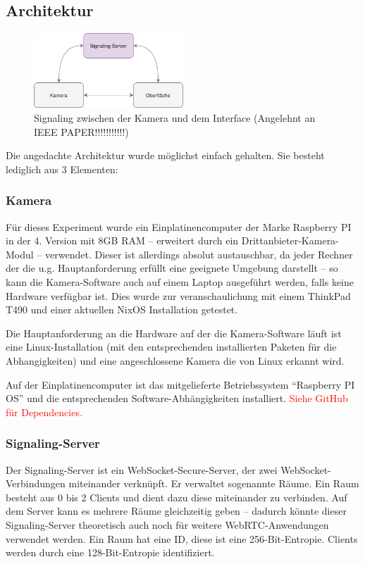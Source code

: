 \documentclass{IEEEtran}
\begin{document}
\begin{twocolumn}
\subsection{Architektur}

\begin{figure}[ht]
	\includegraphics[width=0.5\textwidth]{diagram-signaling}
	\centering
	\caption{Signaling zwischen der Kamera und dem Interface (Angelehnt an IEEE
	PAPER!!!!!!!!!!!)}
\end{figure}

Die angedachte Architektur wurde möglichst einfach gehalten. Sie besteht
lediglich aus 3 Elementen:

\subsubsection{Kamera}

Für dieses Experiment wurde ein Einplatinencomputer der Marke Raspberry PI in
der 4. Version mit 8GB RAM – erweitert durch ein Drittanbieter-Kamera-Modul –
verwendet. Dieser ist allerdings absolut austauschbar, da jeder Rechner der
die u.g. Hauptanforderung erfüllt eine geeignete Umgebung darstellt – so kann
die Kamera-Software auch auf einem Laptop ausgeführt werden, falls keine
Hardware verfügbar ist. Dies wurde zur veranschaulichung mit einem ThinkPad
T490 und einer aktuellen NixOS Installation getestet.

Die Hauptanforderung an die Hardware auf der die Kamera-Software läuft ist eine
Linux-Installation (mit den entsprechenden installierten Paketen für die
Abhangigkeiten) und eine angeschlossene Kamera die von Linux erkannt wird.

Auf der Einplatinencomputer ist das mitgelieferte Betriebssystem ``Raspberry PI
OS'' und die entsprechenden Software-Abhängigkeiten installiert. 
\textcolor{red}{Siehe GitHub für Dependencies.}

\subsubsection{Signaling-Server}

Der Signaling-Server ist ein WebSocket-Secure-Server, der zwei
WebSocket-Verbindungen miteinander verknüpft. Er verwaltet sogenannte Räume.
Ein Raum besteht aus 0 bis 2 Clients und dient dazu diese miteinander zu
verbinden. Auf dem Server kann es mehrere Räume gleichzeitig geben – dadurch
könnte dieser Signaling-Server theoretisch auch noch für weitere
WebRTC-Anwendungen verwendet werden. Ein Raum hat eine ID, diese ist eine
256-Bit-Entropie. Clients werden durch eine 128-Bit-Entropie identifiziert.


\end{twocolumn}
\end{document}
